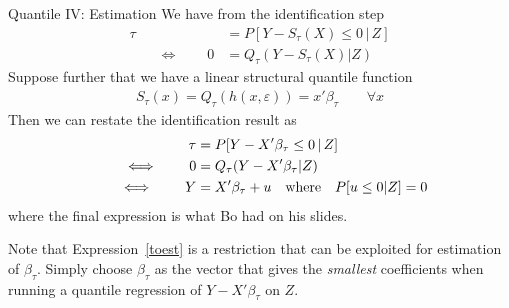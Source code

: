 \documentclass[aspectratio=169, handout]{beamer}
\begin{document}
{\footnotesize
\begin{frame}{Quantile IV: Estimation}
We have from the identification step
\begin{align*}
  \tau
  &=
  P[Y-S_\tau(X)\leq 0\,|\,Z]
  \\
  \qquad\iff\qquad
  0
  &=
  Q_\tau(Y-S_\tau(X)|Z)
\end{align*}
Suppose further that we have a linear structural quantile function
\begin{align*}
  S_\tau(x)
  =
  Q_\tau(h(x,\varepsilon))
  = x'\beta_\tau
  \qquad
  \forall x
\end{align*}
Then we can restate the identification result as
\begin{align}
  \tau
  &=
  P[Y-X'\beta_\tau \leq 0\,|\,Z]
  \notag
  \\
  \qquad\iff\qquad
  0&=
  Q_\tau(Y-X'\beta_\tau|Z)
  \label{toest}
  \\
  \qquad\iff\qquad
  Y &= X'\beta_\tau + u
  \quad\text{where}\quad
  P[u\leq 0|Z]=0
  \notag
\end{align}
where the final expression is what Bo had on his slides.

Note that Expression~\ref{toest} is a restriction that can be exploited
for estimation of $\beta_\tau$.
Simply choose $\beta_\tau$ as the vector that gives the \emph{smallest}
coefficients when running a quantile regression of $Y-X'\beta_\tau$ on
$Z$.
\end{frame}
}
\end{document}
